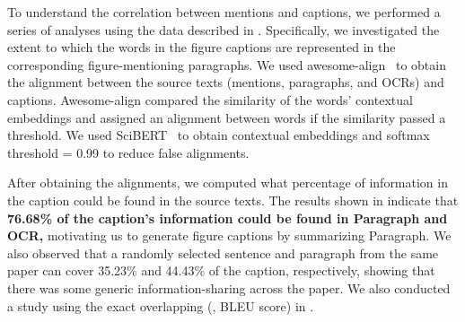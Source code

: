 To understand the correlation between mentions and captions, we performed a series of analyses using the data described in .
Specifically, we investigated the extent to which the words in the figure captions are represented in the corresponding figure-mentioning paragraphs.
We used awesome-align~\cite{dou2021word} to obtain the alignment between the source texts 
(mentions, paragraphs, and OCRs) and captions.
Awesome-align compared the similarity of the words' contextual embeddings 
and assigned an alignment between words if the similarity passed a threshold. 
We used SciBERT~\cite{beltagy-etal-2019-scibert}
to obtain contextual embeddings and softmax threshold = 0.99 to reduce false alignments.

After obtaining the alignments, we computed what percentage of information in the caption could be found in the source texts.
The results shown in  indicate that \textbf{76.68\% of the caption's information could be found in Paragraph and OCR,} motivating us to generate figure captions by summarizing Paragraph.
We also observed that a randomly selected sentence and paragraph from the same paper can cover 35.23\% and 44.43\% of the caption,
respectively, showing that there was some generic information-sharing across the paper.
We also conducted a study using the exact overlapping (\ie, BLEU score) in .